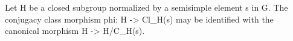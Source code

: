 Let H be a closed subgroup normalized by a semisimple element s in G. The conjugacy class morphism phi: H -> Cl_H(s) may be identified with the canonical morphism H -> H/C_H(s).
